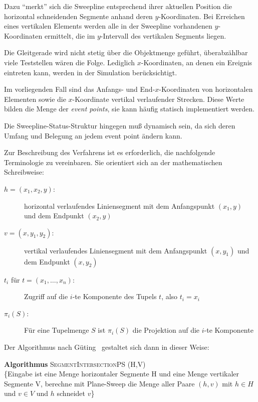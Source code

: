 \documentclass[ngerman]{scrreprt}%
\theoremstyle{break}
\begin{document}
Dazu "`merkt"' sich die Sweepline entsprechend ihrer aktuellen
Position die horizontal schneidenden Segmente anhand deren
$y$-Koordinaten. Bei Erreichen eines vertikalen Elements
werden alle in der Sweepline vorhandenen $y$-Koordinaten
ermittelt, die im $y$-Intervall des vertikalen Segments
liegen.

Die Gleitgerade wird nicht stetig über die Objektmenge
geführt, überabzählbar viele Teststellen wären die Folge. 
Lediglich $x$-Koordinaten, an denen ein Ereignis
eintreten kann, werden in der Simulation berücksichtigt.

Im vorliegenden Fall sind das Anfangs- und End-$x$-Koordinaten von
horizontalen Elementen sowie die $x$-Koordinate 
vertikal verlaufender Strecken. Diese Werte bilden die Menge
der \textit{event points}, sie kann häufig statisch implementiert werden.

Die Sweepline-Status-Struktur hingegen muß dynamisch sein, da sich
deren Umfang und Belegung an jedem event point ändern kann.

Zur Beschreibung des Verfahrens ist es erforderlich, die nachfolgende
Terminologie zu vereinbaren. Sie orientiert sich an der mathematischen
Schreibweise:

\begin{description}

\item[$h=(x_1,x_2,y)$:] horizontal verlaufendes Liniensegment mit dem
    Anfangspunkt $(x_1,y)$ und dem Endpunkt $(x_2,y)$
\item[$v=(x,y_1,y_2)$:] vertikal verlaufendes Liniensegment mit dem
    Anfangspunkt $(x,y_1)$ und dem Endpunkt $(x,y_2)$
\item[$t_i$ für $t=(x_1,\dots,x_n)$:] Zugriff auf die $i$-te Komponente des 
   Tupels $t$, also $t_i=x_i$
\item[$\pi_i(S)$:] Für eine Tupelmenge $S$ ist $\pi_i(S)$ die Projektion
   auf die $i$-te Komponente
\end{description} 

Der Algorithmus nach Güting~\cite{guting} gestaltet sich dann in dieser Weise:

\textbf{Algorithmus} \textsc{SegmentIntersectionPS (H,V)}\\
\{Eingabe ist eine Menge horizontaler Segmente H und eine Menge vertikaler
 Segmente V, berechne mit Plane-Sweep die Menge aller Paare $(h,v)$
mit $h{\in}H$ und $v{\in}V$ und $h$ schneidet $v$\}
\end{document}
